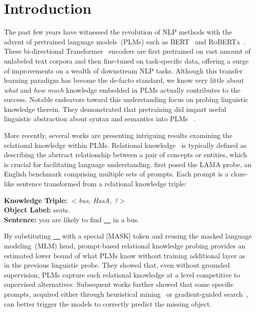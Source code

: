 \section{Introduction}
The past few years have witnessed the revolution of NLP methods with 
the advent of pretrained language models~(PLMs) such as 
\textsc{BERT}~\citep{DBLP:journals/corr/abs-1810-04805} and 
\textsc{RoBERTa}~\citep{DBLP:journals/corr/abs-1907-11692}. These
bi-directional Transformer~\citep{DBLP:journals/corr/VaswaniSPUJGKP17} 
encoders are first pretrained on vast amount of unlabeled text corpora and 
then fine-tuned on task-specific data, offering a surge of 
improvements on a wealth of downstream NLP tasks. Although this transfer learning paradigm has become the 
de-facto standard, we know very little about
\textit{what} and \textit{how much} 
knowledge embedded in PLMs actually contributes to the success. 
Notable endeavors toward this understanding focus on probing linguistic knowledge therein. They demonstrated that 
pretraining did impart useful linguistic abstraction about syntax and semantics into PLMs ~\citep{peters-etal-2018-dissecting,DBLP:journals/corr/abs-1901-05287,DBLP:journals/corr/abs-1905-06316}.


More recently, several works are presenting intriguing results examining 
 the relational knowledge within PLMs. Relational knowledge~\citep{speer-havasi-2012-representing,wikidata} is typically defined as describing the abstract relationship between a pair of concepts or entities, which is crucial for facilitating language understanding.
 \citet{Petroni2020} first posed the LAMA probe, 
 an English benchmark comprising multiple sets of prompts. Each prompt is a cloze-like sentence transformed from a relational knowledge triple:
 
 \noindent
 \textbf{Knowledge Triple: }\textit{$<$bus, HasA, ?$>$} \\
 \textbf{Object Label: }seats. \\
 \textbf{Sentence: }you are likely to find \underline{~~} in a bus.

 

By substituting  \underline{~~}  with a special [MASK] token and reusing the masked language modeling~(MLM) head, prompt-based relational knowledge probing provides an estimated lower bound of what PLMs know without training additional layer as in the previous linguistic probe. They showed that, even without grounded supervision, 
PLMs capture such relational knowledge at a level competitive to supervised alternatives. Subsequent works further showed that some specific prompts, acquired either through heuristical mining~\citep{DBLP:journals/corr/abs-1911-12543} or gradient-guided search~\citep{Shin2020}, can better trigger the models to correctly predict the missing object. 

